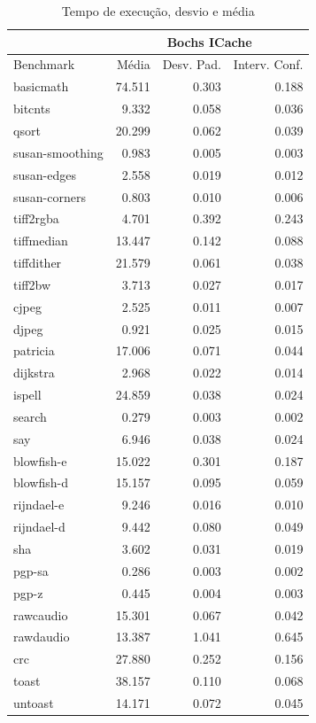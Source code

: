 \documentclass[11pt,twoside]{article}
\begin{document}
\begin{table}
 \caption{Tempo de execução, desvio e média}
 \begin{center}
 \begin{tabular}{|l|r|r|r|}
   \cline{2-4}
   \multicolumn{1}{c|}{}& \multicolumn{3}{|c|}{Bochs ICache} \\ \hline
   Benchmark & Média & Desv. Pad. & Interv. Conf.\\ \hline 
   basicmath & 74.511 & 0.303 & 0.188\\ \hline 
   bitcnts & 9.332 & 0.058 & 0.036\\ \hline 
   qsort & 20.299 & 0.062 & 0.039\\ \hline 
   susan-smoothing & 0.983 & 0.005 & 0.003\\ \hline 
   susan-edges & 2.558 & 0.019 & 0.012\\ \hline 
   susan-corners & 0.803 & 0.010 & 0.006\\ \hline 
   tiff2rgba & 4.701 & 0.392 & 0.243\\ \hline 
   tiffmedian & 13.447 & 0.142 & 0.088\\ \hline 
   tiffdither & 21.579 & 0.061 & 0.038\\ \hline 
   tiff2bw & 3.713 & 0.027 & 0.017\\ \hline 
   cjpeg & 2.525 & 0.011 & 0.007\\ \hline 
   djpeg & 0.921 & 0.025 & 0.015\\ \hline 
   patricia & 17.006 & 0.071 & 0.044\\ \hline 
   dijkstra & 2.968 & 0.022 & 0.014\\ \hline 
   ispell & 24.859 & 0.038 & 0.024\\ \hline 
   search & 0.279 & 0.003 & 0.002\\ \hline 
   say & 6.946 & 0.038 & 0.024\\ \hline 
   blowfish-e & 15.022 & 0.301 & 0.187\\ \hline 
   blowfish-d & 15.157 & 0.095 & 0.059\\ \hline 
   rijndael-e & 9.246 & 0.016 & 0.010\\ \hline 
   rijndael-d & 9.442 & 0.080 & 0.049\\ \hline 
   sha & 3.602 & 0.031 & 0.019\\ \hline 
   pgp-sa & 0.286 & 0.003 & 0.002\\ \hline 
   pgp-z & 0.445 & 0.004 & 0.003\\ \hline 
   rawcaudio & 15.301 & 0.067 & 0.042\\ \hline 
   rawdaudio & 13.387 & 1.041 & 0.645\\ \hline 
   crc & 27.880 & 0.252 & 0.156\\ \hline 
   toast & 38.157 & 0.110 & 0.068\\ \hline 
   untoast & 14.171 & 0.072 & 0.045\\
   \hline
 \end{tabular}
 \label{tab:tempos_boxicache}
 \end{center}
\end{table}

\newpage


\end{document}
